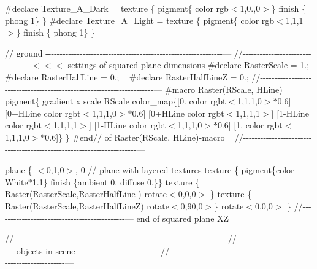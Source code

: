 \#declare Texture\+\_\+\+A\+\_\+\+Dark = texture \{ pigment\{ color rgb$<$1,0.,0$>$\} finish \{ phong 1\} \} \#declare Texture\+\_\+\+A\+\_\+\+Light = texture \{ pigment\{ color rgb$<$1,1,1$>$\} finish \{ phong 1\} \}

// ground -\/-\/-\/-\/-\/-\/-\/-\/-\/-\/-\/-\/-\/-\/-\/-\/-\/-\/-\/-\/-\/-\/-\/-\/-\/-\/-\/-\/-\/-\/-\/-\/-\/-\/-\/-\/-\/-\/-\/-\/-\/-\/-\/-\/-\/-\/-\/-\/-\/-\/-\/-\/-\/-\/-\/-\/-\/-\/-\/-\/-\/-\/--- //-\/-\/-\/-\/-\/-\/-\/-\/-\/-\/-\/-\/-\/-\/-\/-\/-\/-\/-\/-\/-\/-\/-\/-\/-\/-\/-\/-\/-\/-\/---\texorpdfstring{$<$}{<}\texorpdfstring{$<$}{<}\texorpdfstring{$<$}{<} settings of squared plane dimensions \#declare Raster\+Scale = 1.; \#declare Raster\+Half\+Line = 0.; ~\newline
 \#declare Raster\+Half\+LineZ = 0.; //-\/-\/-\/-\/-\/-\/-\/-\/-\/-\/-\/-\/-\/-\/-\/-\/-\/-\/-\/-\/-\/-\/-\/-\/-\/-\/-\/-\/-\/-\/-\/-\/-\/-\/-\/-\/-\/-\/-\/-\/-\/-\/-\/-\/-\/-\/-\/-\/-\/-\/-\/-\/-\/-\/-\/-\/-\/-\/-\/-\/-\/-\/-\/-\/-\/-\/-\/-\/-\/-\/--- \#macro Raster(\+RScale, HLine) pigment\{ gradient x scale RScale color\+\_\+map\{\mbox{[}0. color rgbt$<$1,1,1,0$>$\texorpdfstring{$\ast$}{*}0.6\mbox{]} \mbox{[}0+HLine color rgbt$<$1,1,1,0$>$\texorpdfstring{$\ast$}{*}0.6\mbox{]} \mbox{[}0+HLine color rgbt$<$1,1,1,1$>$\mbox{]} \mbox{[}1-\/HLine color rgbt$<$1,1,1,1$>$\mbox{]} \mbox{[}1-\/HLine color rgbt$<$1,1,1,0$>$\texorpdfstring{$\ast$}{*}0.6\mbox{]} \mbox{[}1. color rgbt$<$1,1,1,0$>$\texorpdfstring{$\ast$}{*}0.6\mbox{]}\} \} \#end// of Raster(\+RScale, HLine)-\/macro ~\newline
 //-\/-\/-\/-\/-\/-\/-\/-\/-\/-\/-\/-\/-\/-\/-\/-\/-\/-\/-\/-\/-\/-\/-\/-\/-\/-\/-\/-\/-\/-\/-\/-\/-\/-\/-\/-\/-\/-\/-\/-\/-\/-\/-\/-\/-\/-\/-\/-\/-\/-\/-\/-\/-\/-\/-\/-\/-\/-\/-\/-\/-\/-\/-\/-\/-\/-\/-\/-\/-\/-\/---

plane \{ \texorpdfstring{$<$}{<}0,1,0\texorpdfstring{$>$}{>}, 0 // plane with layered textures texture \{ pigment\{color White\texorpdfstring{$\ast$}{*}1.1\} finish \{ambient 0. diffuse 0.\}\} texture \{ Raster(\+Raster\+Scale,\+Raster\+Half\+Line ) rotate$<$0,0,0$>$ \} texture \{ Raster(\+Raster\+Scale,\+Raster\+Half\+Line\+Z) rotate$<$0,90,0$>$\} rotate$<$0,0,0$>$ \} //-\/-\/-\/-\/-\/-\/-\/-\/-\/-\/-\/-\/-\/-\/-\/-\/-\/-\/-\/-\/-\/-\/-\/-\/-\/-\/-\/-\/-\/-\/-\/-\/-\/-\/-\/-\/-\/-\/-\/-\/-\/-\/-\/-\/-\/--- end of squared plane XZ

//-\/-\/-\/-\/-\/-\/-\/-\/-\/-\/-\/-\/-\/-\/-\/-\/-\/-\/-\/-\/-\/-\/-\/-\/-\/-\/-\/-\/-\/-\/-\/-\/-\/-\/-\/-\/-\/-\/-\/-\/-\/-\/-\/-\/-\/-\/-\/-\/-\/-\/-\/-\/-\/-\/-\/-\/-\/-\/-\/-\/-\/-\/-\/-\/-\/-\/-\/-\/-\/-\/-\/--- //-\/-\/-\/-\/-\/-\/-\/-\/-\/-\/-\/-\/-\/-\/-\/-\/-\/-\/-\/-\/-\/-\/-\/-\/-\/--- objects in scene -\/-\/-\/-\/-\/-\/-\/-\/-\/-\/-\/-\/-\/-\/-\/-\/-\/-\/-\/-\/-\/-\/-\/-\/-\/--- //-\/-\/-\/-\/-\/-\/-\/-\/-\/-\/-\/-\/-\/-\/-\/-\/-\/-\/-\/-\/-\/-\/-\/-\/-\/-\/-\/-\/-\/-\/-\/-\/-\/-\/-\/-\/-\/-\/-\/-\/-\/-\/-\/-\/-\/-\/-\/-\/-\/-\/-\/-\/-\/-\/-\/-\/-\/-\/-\/-\/-\/-\/-\/-\/-\/-\/-\/-\/-\/-\/-\/---

